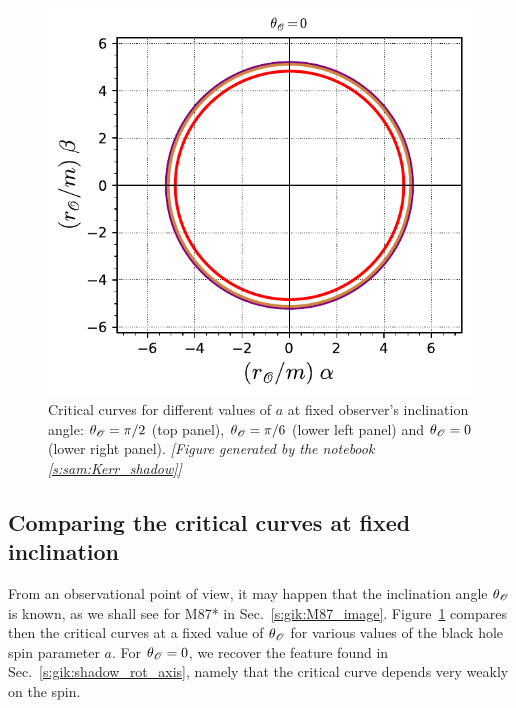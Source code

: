 \begin{figure}
\begin{center}
\includegraphics[height=0.28\textheight]{gik_shadow_comp_th00.pdf}
\end{center}
\caption[]{\label{f:gik:shadow_comp_th} \footnotesize
Critical curves for different values of $a$ at fixed observer's inclination
angle: $\theta_{\mathscr{O}} = \pi/2$ (top panel),   $\theta_{\mathscr{O}} = \pi/6$ (lower left panel)
and $\theta_{\mathscr{O}} = 0$ (lower right panel).
\textsl{[Figure generated by the notebook \ref{s:sam:Kerr_shadow}]}
}
\end{figure}



\subsection{Comparing the critical curves at fixed inclination}

From an observational point of view, it may happen that the inclination angle
$\theta_{\mathscr{O}}$ is known, as we shall see for M87* in Sec.~\ref{s:gik:M87_image}.
Figure~\ref{f:gik:shadow_comp_th} compares then the critical curves at a fixed
value of $\theta_{\mathscr{O}}$ for various values of the black hole spin parameter $a$.
For $\theta_{\mathscr{O}}=0$, we recover the feature found in Sec.~\ref{s:gik:shadow_rot_axis},
namely that the critical curve depends very weakly on the spin.

